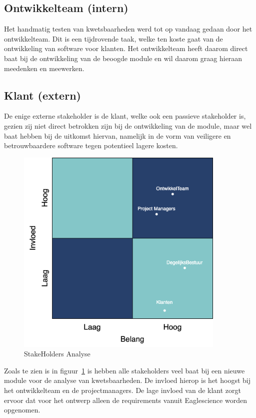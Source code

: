 \subsection{Ontwikkelteam (intern)}\label{subsec:ontwikkelteam-(intern)1}
Het handmatig testen van kwetsbaarheden werd tot op vandaag gedaan door het ontwikkelteam. Dit is een tijdrovende taak, welke ten koste gaat van de ontwikkeling van software voor klanten. Het ontwikkelteam heeft daarom direct baat bij de ontwikkeling van de beoogde module en wil daarom graag hieraan meedenken en meewerken.

\subsection{Klant (extern)}\label{subsec:klant-(extern)1}
De enige externe stakeholder is de klant, welke ook een passieve stakeholder is, gezien zij niet direct betrokken zijn bij de ontwikkeling van de module, maar wel baat hebben bij de uitkomst hiervan, namelijk in de vorm van veiligere en betrouwbaardere software tegen potentieel lagere kosten.

\begin{figure}
    \myfloatalign
    \includegraphics[width=10cm]{gfx/stakeholderanalyse}
    \caption{StakeHolders Analyse}
    \label{fig:StakeholderAnalyse1}
\end{figure}
Zoals te zien is in figuur~\ref{fig:StakeholderAnalyse1} is hebben alle stakeholders veel baat bij een nieuwe module voor de analyse van kwetsbaarheden. De invloed hierop is het hoogst bij het ontwikkelteam en de projectmanagers. De lage invloed van de klant zorgt ervoor dat voor het ontwerp alleen de requirements vanuit Eaglescience worden opgenomen.


